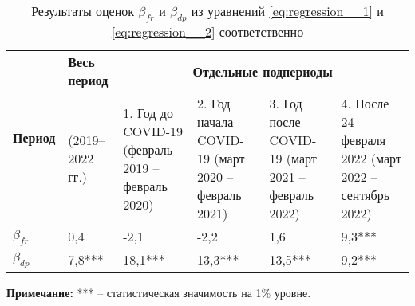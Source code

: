 \begin{table}[h]
	\centering
	\small %
	\caption{Результаты оценок $\beta_{fr}$ и $\beta_{dp}$ из уравнений \ref{eq:regression__1} и \ref{eq:regression__2} соответственно}
	\label{tab:regression_period_results}
	\begin{tabularx}{\textwidth}{|X|X|X|X|X|X|}
		\hline
		\multirow{2}{*}{\textbf{Период}} & \textbf{Весь период} & \multicolumn{4}{c|}{\textbf{Отдельные подпериоды}} \\
		\cline{3-6}
		& (2019–2022 гг.) & 1. Год до COVID-19 (февраль 2019 – февраль 2020) & 2. Год начала COVID-19 (март 2020 – февраль 2021) & 3. Год после COVID-19 (март 2021 – февраль 2022) & 4. После 24 февраля 2022 (март 2022 – сентябрь 2022) \\
		\hline
		$\beta_{fr}$ & 0,4 & -2,1 & -2,2 & 1,6 & 9,3*** \\
		\hline
		$\beta_{dp}$ & 7,8*** & 18,1*** & 13,3*** & 13,5*** & 9,2*** \\
		\hline
	\end{tabularx}
	\begin{tablenotes}
		\item \textbf{Примечание:} *** – статистическая значимость на 1\% уровне.
	\end{tablenotes}
\end{table}





